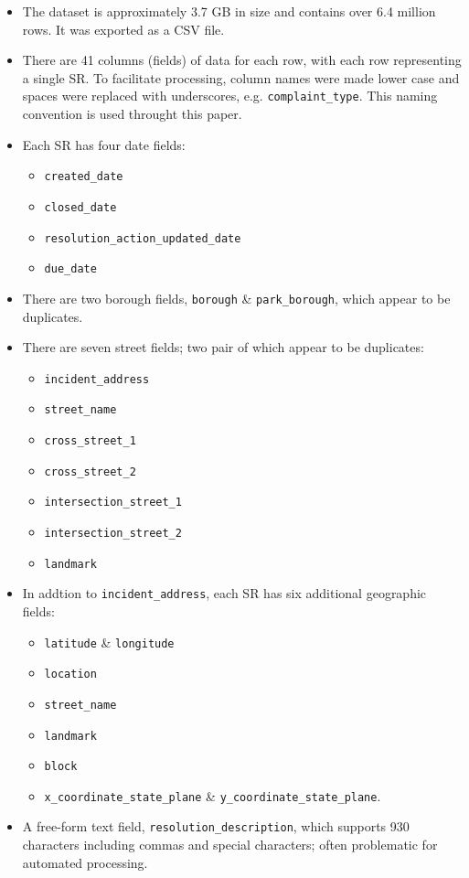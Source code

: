 \documentclass[linenumber]{jdsart}
\begin{document}
\begin{itemize}[left=1.5em]
\item The dataset is approximately 3.7 GB in size and contains 
  over 6.4 million rows. It was exported as a CSV file.

\item There are 41 columns (fields) of data for each row, with each
  row representing a single SR. To facilitate 
  processing, column names were made lower case and 
  spaces were replaced with underscores, e.g. \texttt{complaint\_type}. 
  This naming convention is used throught this paper. 
	
\item Each SR has four date fields: 
	\begin{itemize}	
		\item{\texttt{created\_date}}
		\item{\texttt{closed\_date}}
		\item{\texttt{resolution\_action\_updated\_date}}
		\item{\texttt{due\_date}}
	\end{itemize}

\item There are two borough fields, \texttt{borough} \& \texttt{park\_borough}, 
		which appear to be duplicates.
  
\item There are seven street fields; two pair of which appear to be duplicates:
	\begin{itemize}
		\item{\texttt{incident\_address}}
		\item{\texttt{street\_name}}
		\item{\texttt{cross\_street\_1}}
		\item{\texttt{cross\_street\_2}}
		\item{\texttt{intersection\_street\_1}}
		\item{\texttt{intersection\_street\_2}}
		\item{\texttt{landmark}}
	\end{itemize}
          
\item In addtion to \texttt{incident\_address}, each SR has six
	additional geographic fields:
	\begin{itemize}
		\item{\texttt{latitude} \& \texttt{longitude}}
		\item{\texttt{location}}
		\item{\texttt{street\_name}}
		\item{\texttt{landmark}}
		\item{\texttt{block}}
		\item{\texttt{x\_coordinate\_state\_plane} \& \texttt{y\_coordinate\_state\_plane}}.
 	\end{itemize}
	
\item A free-form text field, \texttt{resolution\_description}, which 
  supports 930 characters including commas and 
  special characters; often problematic for automated processing.
\end{itemize}
\medskip
\end{document}
